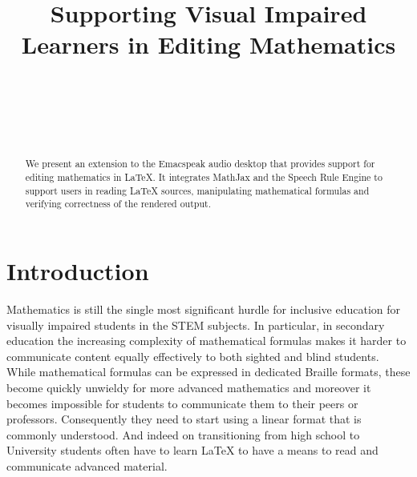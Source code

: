 \documentclass{sig-alternate-05-2015}
\begin{document}


\title{Supporting Visual Impaired Learners in Editing Mathematics}
  

\author{
  \\
  \\
  \\
  \\
}

\maketitle

\begin{abstract}
  We present an extension to the Emacspeak audio desktop that provides support
  for editing mathematics in {\LaTeX}. It integrates MathJax and the Speech Rule
  Engine to support users in reading {\LaTeX} sources, manipulating mathematical
  formulas and verifying correctness of the rendered output.
\end{abstract}



\enlargethispage{10pt}
\section{Introduction}


Mathematics is still the single most significant hurdle for inclusive education
for visually impaired students in the STEM subjects. In particular, in secondary
education the increasing complexity of mathematical formulas makes it harder to
communicate content equally effectively to both sighted and blind students.
While mathematical formulas can be expressed in dedicated Braille formats, these
become quickly unwieldy for more advanced mathematics and moreover it becomes
impossible for students to communicate them to their peers or
professors. Consequently they need to start using a linear format that is
commonly understood. And indeed on transitioning from high school to University
students often have to learn {\LaTeX} to have a means to read and communicate
advanced material.
\end{document}
